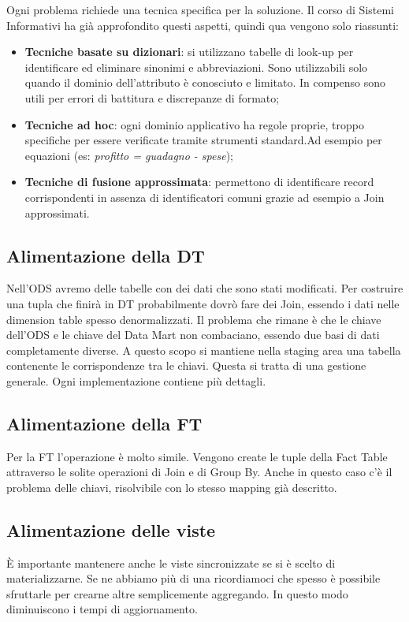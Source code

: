 Ogni problema richiede una tecnica specifica per la soluzione. Il corso di Sistemi Informativi ha già approfondito questi aspetti, quindi qua vengono solo riassunti:

\begin{itemize}
	\item \textbf{Tecniche basate su dizionari}: si utilizzano tabelle di look-up per identificare ed eliminare sinonimi e abbreviazioni. Sono utilizzabili solo quando il dominio dell'attributo è conosciuto e limitato. In compenso sono utili per errori di battitura e discrepanze di formato;
	\item \textbf{Tecniche ad hoc}: ogni dominio applicativo ha regole proprie, troppo specifiche per essere verificate tramite strumenti standard.Ad esempio per equazioni (es: \textit{profitto = guadagno - spese});
	\item \textbf{Tecniche di fusione approssimata}: permettono di identificare record corrispondenti in assenza di identificatori comuni grazie ad esempio a Join approssimati.
\end{itemize}

\subsection{Alimentazione della DT}
Nell'ODS avremo delle tabelle con dei dati che sono stati modificati. Per costruire una tupla che finirà in DT probabilmente dovrò fare dei Join, essendo i dati nelle dimension table spesso denormalizzati. Il problema che rimane è che le chiave dell'ODS e le chiave del Data Mart non combaciano, essendo due basi di dati completamente diverse. A questo scopo si mantiene nella staging area una tabella contenente le corrispondenze tra le chiavi. Questa si tratta di una gestione generale. Ogni implementazione contiene più dettagli.


\subsection{Alimentazione della FT}
Per la FT l'operazione è molto simile. Vengono create le tuple della Fact Table attraverso le solite operazioni di Join e di Group By. Anche in questo caso c'è il problema delle chiavi, risolvibile con lo stesso mapping già descritto.


\subsection{Alimentazione delle viste}
È importante mantenere anche le viste sincronizzate se si è scelto di materializzarne. Se ne abbiamo più di una ricordiamoci che spesso è possibile sfruttarle per crearne altre semplicemente aggregando. In questo modo diminuiscono i tempi di aggiornamento.
